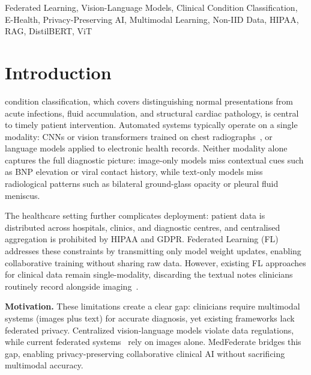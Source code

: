 \documentclass[conference]{IEEEtran}
\begin{document}
\begin{IEEEkeywords}
Federated Learning, Vision-Language Models, Clinical Condition
Classification, E-Health, Privacy-Preserving AI, Multimodal Learning,
Non-IID Data, HIPAA, RAG, DistilBERT, ViT
\end{IEEEkeywords}

\section{Introduction}

 condition classification, which covers
distinguishing normal presentations from acute infections, fluid
accumulation, and structural cardiac pathology, is central to timely
patient intervention.
Automated systems typically operate on a single modality: CNNs or vision
transformers trained on chest radiographs~\cite{Rajpurkar2017,Irvin2019},
or language models applied to electronic health records.
Neither modality alone captures the full diagnostic picture: image-only
models miss contextual cues such as BNP elevation or viral contact
history, while text-only models miss radiological patterns such as
bilateral ground-glass opacity or pleural fluid meniscus.

The healthcare setting further complicates deployment: patient data is
distributed across hospitals, clinics, and diagnostic centres, and
centralised aggregation is prohibited by HIPAA and GDPR. Federated
Learning (FL) addresses these constraints by
transmitting only model weight updates, enabling collaborative training
without sharing raw data. However, existing FL approaches for clinical
data remain single-modality, discarding the textual notes clinicians
routinely record alongside imaging~\cite{Zhao2025,Mao2025,Yan2024}.

\textbf{Motivation.}
These limitations create a clear gap: clinicians require multimodal systems
(images plus text) for accurate diagnosis, yet existing frameworks lack
federated privacy. Centralized vision-language models
violate data regulations, while current federated systems~\cite{Zhao2025,Yan2024}
rely on images alone. MedFederate bridges this gap, enabling privacy-preserving
collaborative clinical AI without sacrificing multimodal accuracy.
\end{document}

